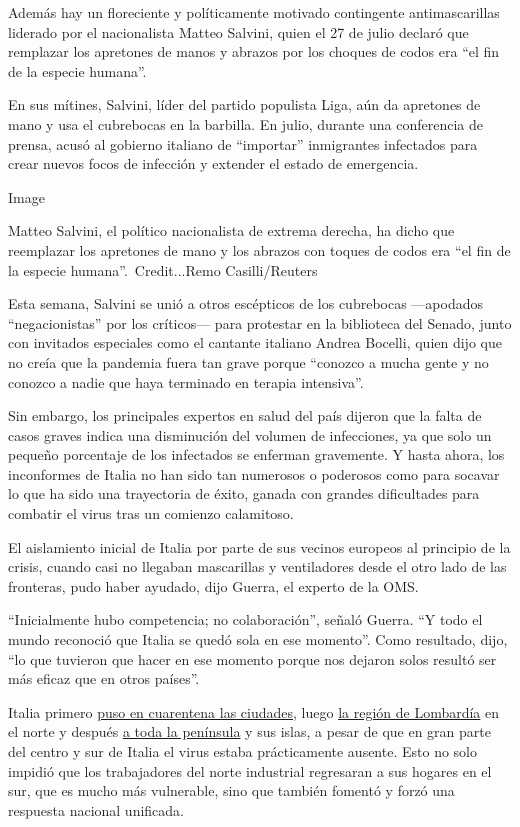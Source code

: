 Además hay un floreciente y políticamente motivado contingente
antimascarillas liderado por el nacionalista Matteo Salvini, quien el 27
de julio declaró que remplazar los apretones de manos y abrazos por los
choques de codos era ``el fin de la especie humana''.

En sus mítines, Salvini, líder del partido populista Liga, aún da
apretones de mano y usa el cubrebocas en la barbilla. En julio, durante
una conferencia de prensa, acusó al gobierno italiano de ``importar''
inmigrantes infectados para crear nuevos focos de infección y extender
el estado de emergencia.

Image

Matteo Salvini, el político nacionalista de extrema derecha, ha dicho
que reemplazar los apretones de mano y los abrazos con toques de codos
era ``el fin de la especie humana''.~Credit...Remo Casilli/Reuters

Esta semana, Salvini se unió a otros escépticos de los cubrebocas
---apodados ``negacionistas'' por los críticos--- para protestar en la
biblioteca del Senado, junto con invitados especiales como el cantante
italiano Andrea Bocelli, quien dijo que no creía que la pandemia fuera
tan grave porque ``conozco a mucha gente y no conozco a nadie que haya
terminado en terapia intensiva''.

Sin embargo, los principales expertos en salud del país dijeron que la
falta de casos graves indica una disminución del volumen de infecciones,
ya que solo un pequeño porcentaje de los infectados se enferman
gravemente. Y hasta ahora, los inconformes de Italia no han sido tan
numerosos o poderosos como para socavar lo que ha sido una trayectoria
de éxito, ganada con grandes dificultades para combatir el virus tras un
comienzo calamitoso.

El aislamiento inicial de Italia por parte de sus vecinos europeos al
principio de la crisis, cuando casi no llegaban mascarillas y
ventiladores desde el otro lado de las fronteras, pudo haber ayudado,
dijo Guerra, el experto de la OMS.

``Inicialmente hubo competencia; no colaboración'', señaló Guerra. ``Y
todo el mundo reconoció que Italia se quedó sola en ese momento''. Como
resultado, dijo, ``lo que tuvieron que hacer en ese momento porque nos
dejaron solos resultó ser más eficaz que en otros países''.

Italia primero
\href{https://www.nytimes.com/2020/02/23/world/europe/italy-coronavirus.html}{puso
en cuarentena las ciudades}, luego
\href{https://www.nytimes.com/2020/03/07/world/europe/coronavirus-italy.html}{la
región de Lombardía} en el norte y después
\href{https://www.nytimes.com/2020/03/09/world/europe/italy-lockdown-coronavirus.html}{a
toda la península} y sus islas, a pesar de que en gran parte del centro
y sur de Italia el virus estaba prácticamente ausente. Esto no solo
impidió que los trabajadores del norte industrial regresaran a sus
hogares en el sur, que es mucho más vulnerable, sino que también fomentó
y forzó una respuesta nacional unificada.

